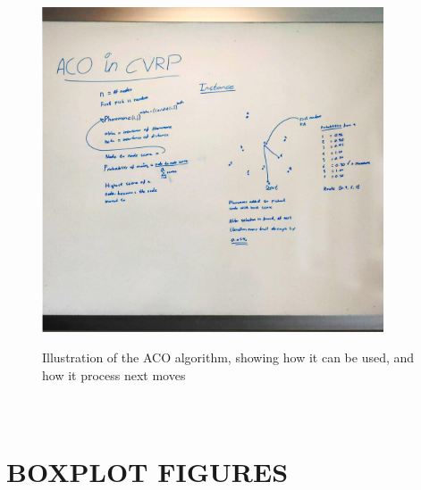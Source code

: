 \documentclass[12pt]{article}
\begin{document}
\begin{figure}[H]
	\caption{Illustration of the ACO algorithm, showing how it can be used, and how it process next moves}
	\centering
	\includegraphics[width=0.9\textwidth]{ACO_Whiteboard.jpg}
	\label{fig:acowhiteboard}

\end{figure}



\section{\\ BOXPLOT FIGURES}

\newpage
\begin{appendices}


\end{appendices}
\end{document}
